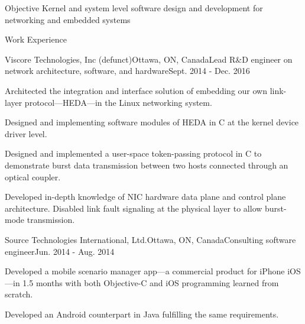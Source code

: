 \documentclass{resume} %
\begin{document}

\begin{rSection}{Objective}
Kernel and system level software design and development for networking and embedded systems
\end{rSection}


\begin{rSection}{Work Experience}

\begin{rSubsection}{Viscore Technologies, Inc (defunct)}{Ottawa, ON, Canada}{Lead R\&D engineer on network architecture, software, and hardware}{Sept. 2014 - Dec. 2016}
\item Architected the integration and interface solution of embedding our own link-layer protocol---HEDA---in the Linux networking system.
\item Designed and implementing software modules of HEDA in C at the kernel device driver level.
\item Designed and implemented a user-space token-passing protocol in C to demonstrate burst data transmission between two hosts connected through an optical coupler.
\item Developed in-depth knowledge of NIC hardware data plane and control plane architecture. Disabled link fault signaling at the physical layer to allow burst-mode transmission.
\end{rSubsection}


\begin{rSubsection}{Source Technologies International, Ltd.}{Ottawa, ON, Canada}{Consulting software engineer}{Jun. 2014 - Aug. 2014}
\item Developed a mobile scenario manager app---a commercial product for iPhone iOS---in 1.5 months with both Objective-C and iOS programming learned from scratch.
\item Developed an Android counterpart in Java fulfilling the same requirements.
\end{rSubsection}

\end{rSection}
\end{document}
